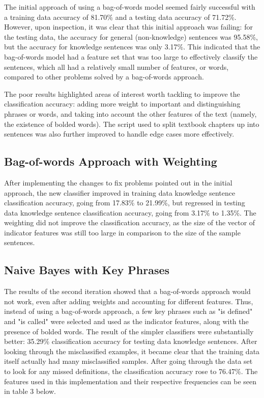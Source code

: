 \documentclass{article} %
\begin{document}
The initial approach of using a bag-of-words model seemed fairly successful with a training data accuracy of 81.70\% and a testing data accuracy of 71.72\%. However, upon inspection, it was clear that this initial approach was failing: for the testing data, the accuracy for general (non-knowledge) sentences was 95.58\%, but the accuracy for knowledge sentences was only 3.17\%. This indicated that the bag-of-words model had a feature set that was too large to effectively classify the sentences, which all had a relatively small number of features, or words, compared to other problems solved by a bag-of-words approach.

The poor results highlighted areas of interest worth tackling to improve the classification accuracy: adding more weight to important and distinguishing phrases or words, and taking into account the other features of the text (namely, the existence of bolded words). The script used to split textbook chapters up into sentences was also further improved to handle edge cases more effectively.

\subsection{Bag-of-words Approach with Weighting}

After implementing the changes to fix problems pointed out in the initial approach, the new classifier improved in training data knowledge sentence classification accuracy, going from 17.83\% to 21.99\%, but regressed in testing data knowledge sentence classification accuracy, going from 3.17\% to 1.35\%. The weighting did not improve the classification accuracy, as the size of the vector of indicator features was still too large in comparison to the size of the sample sentences.

\subsection{Naive Bayes with Key Phrases}

The results of the second iteration showed that a bag-of-words approach would not work, even after adding weights and accounting for different features. Thus, instead of using a bag-of-words approach, a few key phrases such as "is defined" and "is called" were selected and used as the indicator features, along with the presence of bolded words. The result of the simpler classifiers were substantially better: 35.29\% classification accuracy for testing data knowledge sentences. After looking through the misclassified examples, it became clear that the training data itself actually had many misclassified samples. After going through the data set to look for any missed definitions, the classification accuracy rose to 76.47\%. The features used in this implementation and their respective frequencies can be seen in table 3 below.
\end{document}
